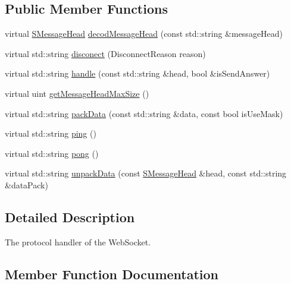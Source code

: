 \subsection*{Public Member Functions}
\begin{DoxyCompactItemize}
\item 
virtual \mbox{\hyperlink{struct_net_1_1_s_message_head}{S\+Message\+Head}} \mbox{\hyperlink{class_net_1_1_c_net_handler_web_socket_a26a43acb16b7879df22aa3ce3fc1d172}{decod\+Message\+Head}} (const std\+::string \&message\+Head)
\item 
virtual std\+::string \mbox{\hyperlink{class_net_1_1_c_net_handler_web_socket_ac5a2c812c7a1fdb426265a4590409ae3}{disconect}} (Disconnect\+Reason reason)
\item 
virtual std\+::string \mbox{\hyperlink{class_net_1_1_c_net_handler_web_socket_ad4c16a911b8cb26f69dda807b5ca2c70}{handle}} (const std\+::string \&head, bool \&is\+Send\+Answer)
\item 
virtual uint \mbox{\hyperlink{class_net_1_1_c_net_handler_web_socket_a5c3fa1c1f926119482b25159afffb6cd}{get\+Message\+Head\+Max\+Size}} ()
\item 
virtual std\+::string \mbox{\hyperlink{class_net_1_1_c_net_handler_web_socket_aa408c8c686da45c36969a7dcf7478daa}{pack\+Data}} (const std\+::string \&data, const bool is\+Use\+Mask)
\item 
virtual std\+::string \mbox{\hyperlink{class_net_1_1_c_net_handler_web_socket_aa19e13e42fa3a31ab8d8a8291af4b5e6}{ping}} ()
\item 
virtual std\+::string \mbox{\hyperlink{class_net_1_1_c_net_handler_web_socket_a51d3618ba601abc5047cf0da91b8a374}{pong}} ()
\item 
virtual std\+::string \mbox{\hyperlink{class_net_1_1_c_net_handler_web_socket_a09297039609dca2d8e2c376626ef78f1}{unpack\+Data}} (const \mbox{\hyperlink{struct_net_1_1_s_message_head}{S\+Message\+Head}} \&head, const std\+::string \&data\+Pack)
\end{DoxyCompactItemize}


\subsection{Detailed Description}
The protocol handler of the Web\+Socket. 

\subsection{Member Function Documentation}
\mbox{\label{class_net_1_1_c_net_handler_web_socket_a26a43acb16b7879df22aa3ce3fc1d172}} 
